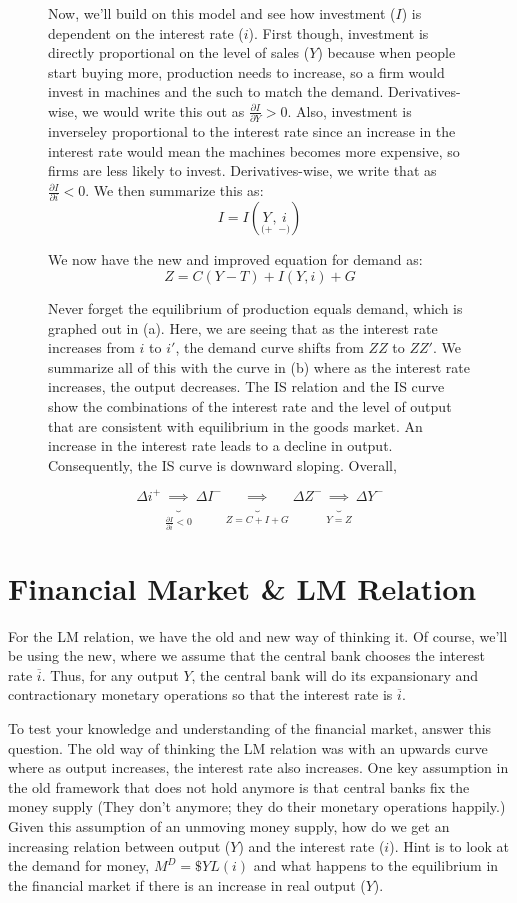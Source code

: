 \documentclass{extarticle}
\begin{document}
\begin{figure}[h]
\begin{minipage}{0.6\linewidth}
    Now, we'll build on this model and see how investment ($I$) is dependent on the interest rate ($i$). First though, investment is directly proportional on the level of sales ($Y$) because when people start buying more, production needs to increase, so a firm would invest in machines and the such to match the demand. Derivatives-wise, we would write this out as $ \frac{\partial I}{\partial Y} > 0$. Also, investment is inverseley proportional to the interest rate since an increase in the interest rate would mean the machines becomes more expensive, so firms are less likely to invest. Derivatives-wise, we write that as  $\frac{\partial I}{\partial i} < 0$. We then summarize this as:
    $$I = I(\underset{(+}{Y}, \underset{-)}{i})$$

    We now have the new and improved equation for demand as:
    $$Z = C(Y-T) + I(Y, i) + G$$

    Never forget the equilibrium of production equals demand, which is graphed out in (a). Here, we are seeing that as the interest rate increases from $i$ to $i'$, the demand curve shifts from $ZZ$ to $ZZ'$. We summarize all of this with the curve in (b) where as the interest rate increases, the output decreases. The IS relation and the IS curve show the combinations of the interest rate and the level of output that are consistent with equilibrium in the goods market. An increase in the interest rate leads to a decline in output. Consequently, the IS curve is downward sloping. Overall,
  \end{minipage}
\end{figure}


$$\Delta i^+ \underbrace{\implies}_{\frac{\partial I}{\partial i} < 0}  \Delta I^- \underbrace{\implies}_{Z = C + I + G} \Delta Z^- \underbrace{\implies}_{Y=Z} \Delta Y^-$$ 

\section{Financial Market \& LM Relation}
For the LM relation, we have the old and new way of thinking it. Of course, we'll be using the new, where we assume that the central bank chooses the interest rate $\overline{i}$. Thus, for any output $Y$, the central bank will do its expansionary and contractionary monetary operations so that the interest rate is $\overline{i}$.

To test your knowledge and understanding of the financial market, answer this question. The old way of thinking the LM relation was with an upwards curve where as output increases, the interest rate also increases. One key assumption in the old framework that does not hold anymore is that central banks fix the money supply (They don't anymore; they do their monetary operations happily.) Given this assumption of an unmoving money supply, how do we get an increasing relation between output ($Y$) and the interest rate ($i$). Hint is to look at the demand for money, $M^D = \$Y L(i)$ and what happens to the equilibrium in the financial market if there is an increase in real output ($Y$).
\end{document}
